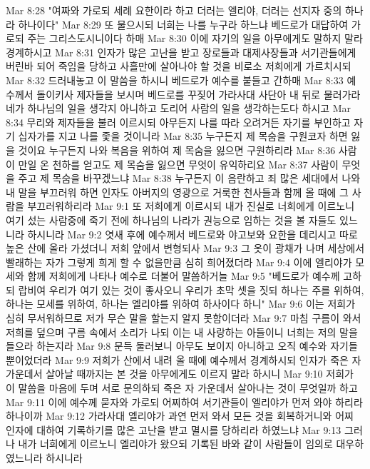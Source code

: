 Mar 8:28  "여짜와 가로되 세례 요한이라 하고 더러는 엘리야, 더러는 선지자 중의 하나라 하나이다"
Mar 8:29  또 물으시되 너희는 나를 누구라 하느냐 베드로가 대답하여 가로되 주는 그리스도시니이다 하매
Mar 8:30  이에 자기의 일을 아무에게도 말하지 말라 경계하시고
Mar 8:31  인자가 많은 고난을 받고 장로들과 대제사장들과 서기관들에게 버린바 되어 죽임을 당하고 사흘만에 살아나야 할 것을 비로소 저희에게 가르치시되
Mar 8:32  드러내놓고 이 말씀을 하시니 베드로가 예수를 붙들고 간하매
Mar 8:33  예수께서 돌이키사 제자들을 보시며 베드로를 꾸짖어 가라사대 사단아 내 뒤로 물러가라 네가 하나님의 일을 생각지 아니하고 도리어 사람의 일을 생각하는도다 하시고
Mar 8:34  무리와 제자들을 불러 이르시되 아무든지 나를 따라 오려거든 자기를 부인하고 자기 십자가를 지고 나를 좇을 것이니라
Mar 8:35  누구든지 제 목숨을 구원코자 하면 잃을 것이요 누구든지 나와 복음을 위하여 제 목숨을 잃으면 구원하리라
Mar 8:36  사람이 만일 온 천하를 얻고도 제 목숨을 잃으면 무엇이 유익하리요
Mar 8:37  사람이 무엇을 주고 제 목숨을 바꾸겠느냐
Mar 8:38  누구든지 이 음란하고 죄 많은 세대에서 나와 내 말을 부끄러워 하면 인자도 아버지의 영광으로 거룩한 천사들과 함께 올 때에 그 사람을 부끄러워하리라
Mar 9:1  또 저희에게 이르시되 내가 진실로 너희에게 이르노니 여기 섰는 사람중에 죽기 전에 하나님의 나라가 권능으로 임하는 것을 볼 자들도 있느니라 하시니라
Mar 9:2  엿새 후에 예수께서 베드로와 야고보와 요한을 데리시고 따로 높은 산에 올라 가셨더니 저희 앞에서 변형되사
Mar 9:3  그 옷이 광채가 나며 세상에서 빨래하는 자가 그렇게 희게 할 수 없을만큼 심히 희어졌더라
Mar 9:4  이에 엘리야가 모세와 함께 저희에게 나타나 예수로 더불어 말씀하거늘
Mar 9:5  "베드로가 예수께 고하되 랍비여 우리가 여기 있는 것이 좋사오니 우리가 초막 셋을 짓되 하나는 주를 위하여, 하나는 모세를 위하여, 하나는 엘리야를 위하여 하사이다 하니"
Mar 9:6  이는 저희가 심히 무서워하므로 저가 무슨 말을 할는지 알지 못함이더라
Mar 9:7  마침 구름이 와서 저희를 덮으며 구름 속에서 소리가 나되 이는 내 사랑하는 아들이니 너희는 저의 말을 들으라 하는지라
Mar 9:8  문득 둘러보니 아무도 보이지 아니하고 오직 예수와 자기들 뿐이었더라
Mar 9:9  저희가 산에서 내려 올 때에 예수께서 경계하시되 인자가 죽은 자 가운데서 살아날 때까지는 본 것을 아무에게도 이르지 말라 하시니
Mar 9:10  저희가 이 말씀을 마음에 두며 서로 문의하되 죽은 자 가운데서 살아나는 것이 무엇일까 하고
Mar 9:11  이에 예수께 묻자와 가로되 어찌하여 서기관들이 엘리야가 먼저 와야 하리라 하나이까
Mar 9:12  가라사대 엘리야가 과연 먼저 와서 모든 것을 회복하거니와 어찌 인자에 대하여 기록하기를 많은 고난을 받고 멸시를 당하리라 하였느냐
Mar 9:13  그러나 내가 너희에게 이르노니 엘리야가 왔으되 기록된 바와 같이 사람들이 임의로 대우하였느니라 하시니라
